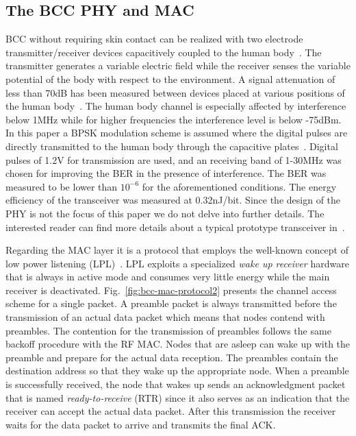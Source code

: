 \documentclass[10pt]{IEEEtran}
\newcounter{section:outage-analysis}
\begin{document}
\subsection{The BCC PHY and MAC}
BCC without requiring skin contact can be realized with two electrode transmitter/receiver devices capacitively coupled to the human body~\cite{baldus09}. The transmitter generates a variable electric field while the receiver senses the variable potential of the body with respect to the environment. A signal attenuation of less than 70dB has been measured between devices placed at various positions of the human body~\cite{schenk08}. The human body channel is especially affected by interference below 1MHz while for higher frequencies the interference level is below -75dBm. In this paper a BPSK modulation scheme is assumed where the digital pulses are directly transmitted to the human body through the capacitive plates~\cite{fazzi09}. Digital pulses of 1.2V for transmission are used, and an receiving band of 1-30MHz was chosen for improving the BER in the presence of interference. The BER was measured to be lower than $10^{-6}$ for the aforementioned conditions. The energy efficiency of the transceiver was measured at 0.32nJ/bit. Since the design of the PHY is not the focus of this paper we do not delve into further details. The interested reader can find more details about a typical prototype transceiver in~\cite{fazzi09}.

Regarding the MAC layer it is a protocol that employs the well-known concept of low power listening (LPL)~\cite{buettner06}. LPL exploits a specialized \textit{wake up receiver} hardware that is always in active mode and consumes very little energy while the main receiver is deactivated. Fig.~\ref{fig:bcc-mac-protocol2} presents the channel access scheme for a single packet. A preamble packet is always transmitted before the transmission of an actual data packet which means that nodes contend with preambles. The contention for the transmission of preambles follows the same backoff procedure with the RF MAC. Nodes that are asleep can wake up with the preamble and prepare for the actual data reception. The preambles contain the destination address so that they wake up the appropriate node. When a preamble is successfully received, the node that wakes up sends an acknowledgment packet that is named \emph{ready-to-receive} (RTR) since it also serves as an indication that the receiver can accept the actual data packet. After this transmission the receiver waits for the data packet to arrive and transmits the final ACK.
\end{document}
